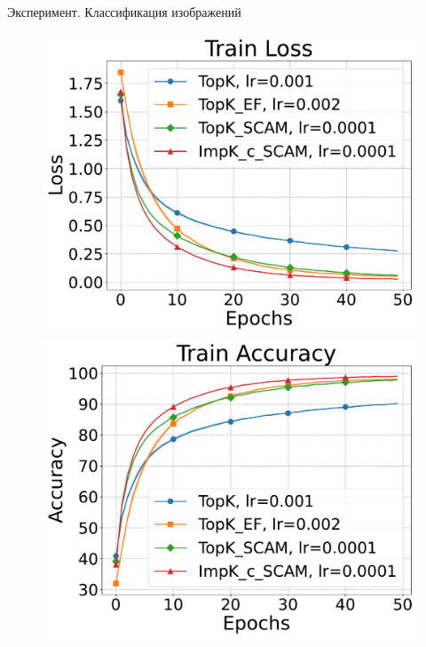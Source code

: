 \documentclass{beamer}
\begin{document}
\begin{frame}{Эксперимент. Классификация изображений}

    \begin{figure}[ht]
        \centering
        \begin{minipage}{0.4\textwidth}
            \includegraphics[width=\textwidth]{../paper/figures/resnet/experiment2/Train Loss.pdf}
        \end{minipage}
        \begin{minipage}{0.4\textwidth}
            \includegraphics[width=\textwidth]{../paper/figures/resnet/experiment2/Train Accuracy.pdf}

\end{minipage}
\end{figure}
\end{frame}
\end{document}
